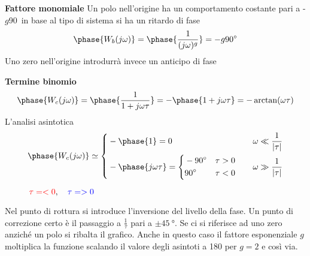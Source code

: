 \newpage
\textbf{Fattore monomiale} Un polo nell'origine ha un comportamento costante
pari a -$g$90\textdegree\ in base al tipo di sistema si ha un ritardo di fase
$$
\phase{W_b(j\omega)} = \phase{\frac{1}{(j\omega)^g}} = -g\SI{90}{\degree}
$$
Uno zero nell'origine introdurrà invece un anticipo di fase

\textbf{Termine binomio}
$$
\phase{W_c(j\omega)} = \phase{\frac{1}{1+j\omega \tau}} =
-\phase{1+j\omega\tau} = -\arctan(\omega\tau)
$$
L'analisi asintotica
$$
\phase{W_c(j\omega)} \simeq \left\{
\begin{aligned}
&-\phase{1}= 0 & & & \omega \ll \frac{1}{|\tau|} \\
&-\phase{j\omega\tau} = \left\{
\begin{aligned}
&\SI{-90}{\degree} & &\tau> 0 \\
&\SI{90}{\degree} & & \tau<0
\end{aligned}\right. & & & \omega \gg \frac{1}{|\tau|}
\end{aligned}\right.
$$

\begin{figure}[h]
\centering
{}
\caption{$\textcolor{red}{\tau=<0},\quad
\textcolor{blue}{\tau=>0} $}
\end{figure}
Nel punto di rottura si introduce l'inversione del livello della fase.
Un punto di correzione certo è il passaggio a $\frac{1}{\tau}$ pari a $\pm
\SI{45}{\degree}$. Se ci si riferisce ad uno zero anziché un polo si ribalta il
grafico.
Anche in questo caso il fattore esponenziale $g$ moltiplica la funzione
scalando il valore degli asintoti a 180 per $g=2$ e così via.

